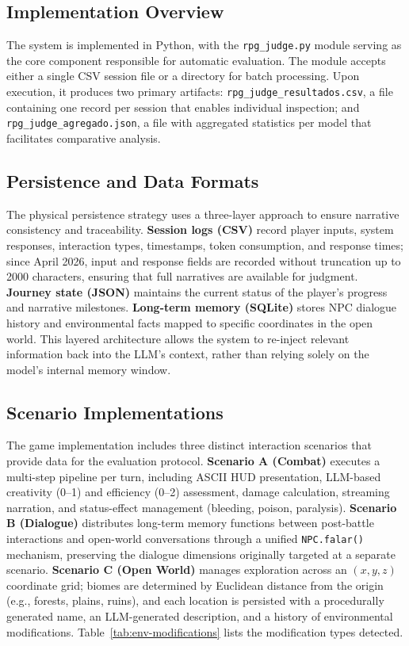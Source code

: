 \documentclass[12pt]{article}
\begin{document}
\subsection{Implementation Overview}

The system is implemented in Python, with the \texttt{rpg\_judge.py} module serving as the core component responsible for automatic evaluation. The module accepts either a single CSV session file or a directory for batch processing. Upon execution, it produces two primary artifacts: \texttt{rpg\_judge\_resultados.csv}, a file containing one record per session that enables individual inspection; and \texttt{rpg\_judge\_agregado.json}, a file with aggregated statistics per model that facilitates comparative analysis.

\subsection{Persistence and Data Formats}

The physical persistence strategy uses a three-layer approach to ensure narrative consistency and traceability. \textbf{Session logs (CSV)} record player inputs, system responses, interaction types, timestamps, token consumption, and response times; since April 2026, input and response fields are recorded without truncation up to 2000 characters, ensuring that full narratives are available for judgment. \textbf{Journey state (JSON)} maintains the current status of the player's progress and narrative milestones. \textbf{Long-term memory (SQLite)} stores NPC dialogue history and environmental facts mapped to specific coordinates in the open world. This layered architecture allows the system to re-inject relevant information back into the LLM's context, rather than relying solely on the model's internal memory window.

\subsection{Scenario Implementations}

The game implementation includes three distinct interaction scenarios that provide data for the evaluation protocol. \textbf{Scenario A (Combat)} executes a multi-step pipeline per turn, including ASCII HUD presentation, LLM-based creativity (0--1) and efficiency (0--2) assessment, damage calculation, streaming narration, and status-effect management (bleeding, poison, paralysis). \textbf{Scenario B (Dialogue)} distributes long-term memory functions between post-battle interactions and open-world conversations through a unified \texttt{NPC.falar()} mechanism, preserving the dialogue dimensions originally targeted at a separate scenario. \textbf{Scenario C (Open World)} manages exploration across an $(x,y,z)$ coordinate grid; biomes are determined by Euclidean distance from the origin (e.g., forests, plains, ruins), and each location is persisted with a procedurally generated name, an LLM-generated description, and a history of environmental modifications. Table~\ref{tab:env-modifications} lists the modification types detected.
\end{document}

